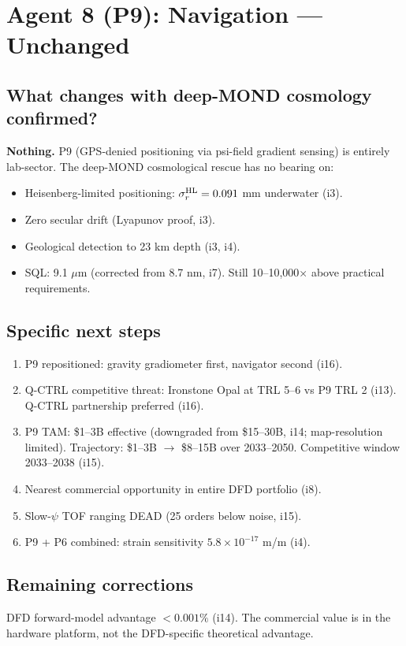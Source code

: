 \documentclass[11pt]{article}
\begin{document}
\section{Agent 8 (P9): Navigation --- Unchanged}
\label{sec:agent8}

\subsection{What changes with deep-MOND cosmology confirmed?}

\textbf{Nothing.} P9 (GPS-denied positioning via psi-field gradient sensing)
is entirely lab-sector. The deep-MOND cosmological rescue has no bearing on:
\begin{itemize}
\item Heisenberg-limited positioning: $\sigma_r^{\rm HL} = 0.091$ mm underwater (i3).
\item Zero secular drift (Lyapunov proof, i3).
\item Geological detection to 23 km depth (i3, i4).
\item SQL: 9.1 $\mu$m (corrected from 8.7 nm, i7). Still 10--10,000$\times$ above
practical requirements.
\end{itemize}

\subsection{Specific next steps}
\begin{enumerate}
\item P9 repositioned: gravity gradiometer first, navigator second (i16).
\item Q-CTRL competitive threat: Ironstone Opal at TRL 5--6 vs P9 TRL 2 (i13).
Q-CTRL partnership preferred (i16).
\item P9 TAM: \$1--3B effective (downgraded from \$15--30B, i14; map-resolution limited).
Trajectory: \$1--3B $\to$ \$8--15B over 2033--2050. Competitive window 2033--2038 (i15).
\item Nearest commercial opportunity in entire DFD portfolio (i8).
\item Slow-$\psi$ TOF ranging DEAD (25 orders below noise, i15).
\item P9 + P6 combined: strain sensitivity $5.8 \times 10^{-17}$ m/m (i4).
\end{enumerate}

\subsection{Remaining corrections}
DFD forward-model advantage $< 0.001\%$ (i14). The commercial value is in the
hardware platform, not the DFD-specific theoretical advantage.
\end{document}
